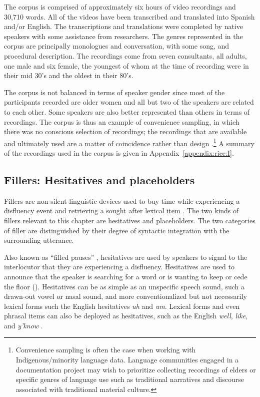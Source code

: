 \documentclass[output=paper]{langscibook}
\begin{document}
The corpus is comprised of approximately six  hours of video recordings and 30,710 words. All of the videos have been transcribed and translated into Spanish and/or English. The transcriptions and translations were completed by native speakers with some assistance from researchers. The genres represented in the corpus are principally monologues and conversation, with some song, and procedural description. The recordings come from seven consultants, all adults, one male and six female, the youngest of whom at the time of recording were in their mid 30’s and the oldest in their 80’s. 

The corpus is not balanced in terms of speaker gender since most of the participants recorded are older women and all but two of the speakers are related to each other. Some speakers are also better represented than others in terms of recordings. The corpus is thus an example of convenience sampling, in which there was no conscious selection of recordings; the recordings that are available and ultimately used are a matter of coincidence rather than design \citep[64]{Seifart2008}.\footnote{Convenience sampling is often the case when working with Indigenous/minority language data. Language communities engaged in a documentation project may wish to prioritize collecting recordings of elders or specific genres of language use such as traditional narratives and discourse associated with traditional material culture.}  A summary of the recordings used in the corpus is given in Appendix~\ref{appendix:rice:I}. 

\subsection{Fillers: Hesitatives and placeholders}
\label{sec:rice:2.3}

Fillers are non-silent linguistic devices used to buy time while experiencing a disfluency event and retrieving a sought after lexical item \citep{Fox2010}. The two kinds of fillers relevant to this chapter are hesitatives and placeholders. The two categories of filler are distinguished by their degree of syntactic integration with the surrounding utterance.

Also known as “filled pauses” \citep{Lickley2015}, hesitatives are used by speakers to signal to the interlocutor that they are experiencing a disfluency. Hesitatives are used to announce that the speaker is searching for a word or is wanting to keep or cede the floor (\citealt{Clark2002}). Hesitatives can be as simple as an unspecific speech sound, such a drawn-out vowel or nasal sound, and more conventionalized but not necessarily lexical forms such the English hesitatives \textit{uh} and \textit{um}. Lexical forms and even phrasal items can also be deployed as hesitatives, such as the English \textit{well}, \textit{like}, and \textit{y’know} \citep[1]{Fox2010}.
\end{document}
